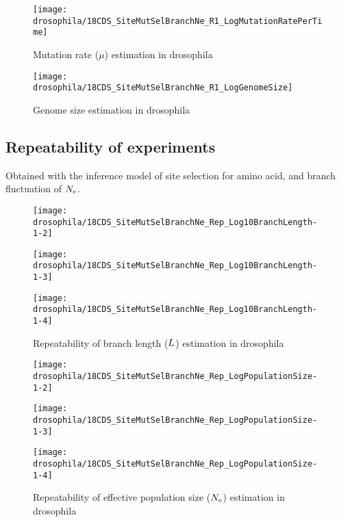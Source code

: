\begin{figure}[H]
    \centering
    \texttt{[image: drosophila/18CDS\_SiteMutSelBranchNe\_R1\_LogMutationRatePerTime]}
    \caption[Mutation rate estimation in drosophila]{Mutation rate ($\mu$) estimation in drosophila}
\end{figure}

\begin{figure}[H]
    \centering
    \texttt{[image: drosophila/18CDS\_SiteMutSelBranchNe\_R1\_LogGenomeSize]}
    \caption[Genome size estimation in drosophila]{Genome size estimation in drosophila}
\end{figure}

\subsection{Repeatability of experiments}
Obtained with the inference model of site selection for amino acid, and branch fluctuation of $N_{\mathrm{e}}$.

\begin{figure}[H]
    \centering
    \begin{minipage}{0.32\linewidth}
        \texttt{[image: drosophila/18CDS\_SiteMutSelBranchNe\_Rep\_Log10BranchLength-1-2]}
    \end{minipage} \hfill
    \begin{minipage}{0.32\linewidth}
        \texttt{[image: drosophila/18CDS\_SiteMutSelBranchNe\_Rep\_Log10BranchLength-1-3]}
    \end{minipage} \hfill
    \begin{minipage}{0.32\linewidth}
        \texttt{[image: drosophila/18CDS\_SiteMutSelBranchNe\_Rep\_Log10BranchLength-1-4]}
    \end{minipage}
    \caption[Repeatability of branch length estimation in drosophila]{Repeatability of branch length ($L$) estimation in drosophila}
\end{figure}

\begin{figure}[H]
    \centering
    \begin{minipage}{0.32\linewidth}
        \texttt{[image: drosophila/18CDS\_SiteMutSelBranchNe\_Rep\_LogPopulationSize-1-2]}
    \end{minipage} \hfill
    \begin{minipage}{0.32\linewidth}
        \texttt{[image: drosophila/18CDS\_SiteMutSelBranchNe\_Rep\_LogPopulationSize-1-3]}
    \end{minipage} \hfill
    \begin{minipage}{0.32\linewidth}
        \texttt{[image: drosophila/18CDS\_SiteMutSelBranchNe\_Rep\_LogPopulationSize-1-4]}
    \end{minipage}
    \caption[Repeatability of {effective population size} estimation in drosophila]{Repeatability of {effective population size} ($N_{\mathrm{e}}$) estimation in drosophila}
\end{figure}

